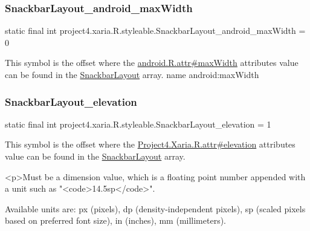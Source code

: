 \subsubsection{\texorpdfstring{Snackbar\+Layout\+\_\+android\+\_\+max\+Width}{SnackbarLayout\_android\_maxWidth}}
{\footnotesize\ttfamily static final int project4.\+xaria.\+R.\+styleable.\+Snackbar\+Layout\+\_\+android\+\_\+max\+Width = 0\hspace{0.3cm}{\ttfamily [static]}}

This symbol is the offset where the \hyperlink{}{android.\+R.\+attr\#max\+Width} attribute\textquotesingle{}s value can be found in the \hyperlink{classproject4_1_1xaria_1_1R_1_1styleable_ab79dc56e0952cebd4f7831958f917b48}{Snackbar\+Layout} array.  name android\+:max\+Width \mbox{\label{classproject4_1_1xaria_1_1R_1_1styleable_ab22b388ecf19f24c4ad1e2f82bedc866}} 
\subsubsection{\texorpdfstring{Snackbar\+Layout\+\_\+elevation}{SnackbarLayout\_elevation}}
{\footnotesize\ttfamily static final int project4.\+xaria.\+R.\+styleable.\+Snackbar\+Layout\+\_\+elevation = 1\hspace{0.3cm}{\ttfamily [static]}}

This symbol is the offset where the \hyperlink{}{Project4.\+Xaria.\+R.\+attr\#elevation} attribute\textquotesingle{}s value can be found in the \hyperlink{classproject4_1_1xaria_1_1R_1_1styleable_ab79dc56e0952cebd4f7831958f917b48}{Snackbar\+Layout} array.

\begin{DoxyVerb}      <p>Must be a dimension value, which is a floating point number appended with a unit such as "<code>14.5sp</code>".
\end{DoxyVerb}
 Available units are\+: px (pixels), dp (density-\/independent pixels), sp (scaled pixels based on preferred font size), in (inches), mm (millimeters). 

